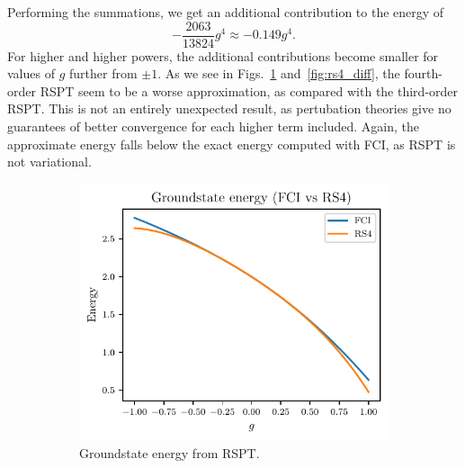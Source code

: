 Performing the summations, we get an additional contribution to the energy of
\begin{equation*}
    -\frac{2063}{13824} g^4 \approx -0.149 g^4.
\end{equation*}
For higher and higher powers, the additional contributions become smaller for values of $g$ further from $\pm 1$.
As we see in Figs.~\ref{fig:rs4_energy} and~\ref{fig:rs4_diff}, the fourth-order RSPT seem to be a worse approximation, as compared with the third-order RSPT. %
This is not an entirely unexpected result, as pertubation theories give no guarantees of better convergence for each higher term included.
Again, the approximate energy falls below the exact energy computed with FCI, as RSPT is not variational.

\begin{figure}[htbp]
    \centering
    \begin{subfigure}[b]{0.45\textwidth}
        \centering
        \includegraphics[width=\textwidth]{figures/g_groundstate_energy.pdf}
        \caption{
            Groundstate energy from RSPT.\label{fig:rs4_energy}
        }
    \end{subfigure}
    \hfill
    \begin{subfigure}[b]{0.48\textwidth}
        \centering

\end{subfigure}
\end{figure}

